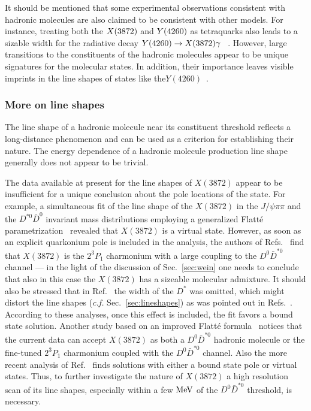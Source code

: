 It should be mentioned that some experimental observations consistent with
hadronic molecules are also claimed to be consistent with other models. For
instance, treating both the $X(3872)$ and $Y(4260)$ as tetraquarks also leads to a sizable
width for the radiative decay $Y(4260)\to X(3872)\gamma$ ~\cite{Chen:2015dig}.
However, large transitions to the constituents of the hadronic molecules appear
to be unique signatures for the molecular states.
In addition, their importance leaves visible imprints in the line shapes of
states like  the$Y(4260)$~\cite{Cleven:2013mka,Qin:2016spb}.
 	



\subsubsection{More on line shapes}
\label{sec:morelineshapes}

The line shape of a hadronic molecule near its constituent threshold
reflects a long-distance phenomenon and can be used as a criterion for
establishing their nature.
The energy dependence of a hadronic molecule production line shape
generally does not appear to be trivial.

The data available at present for the line shapes of $X(3872)$ appear to be
insufficient for a unique conclusion about the pole locations of the state.
For example, a simultaneous fit of the line shape of the $X(3872)$ in the
$J/\psi\pi\pi$ and the $D^{*0}\bar{D}^0$ invariant mass distributions employing
a generalized  Flatt\'e parametrization~\cite{Hanhart:2007yq} revealed that
$X(3872)$ is a virtual state.
However, as soon as an explicit quarkonium pole is included in the analysis, the
authors of Refs.~\cite{Zhang:2009bv,Kalashnikova:2009gt,Meng:2014ota} find that
$X(3872)$ is the $2^3P_1$ charmonium with a large coupling to the
$D^0\bar{D}^{*0}$ channel --- in the light of the discussion of
Sec.~\ref{sec:wein} one needs to conclude that also in this case the $X(3872)$
has a sizeable molecular admixture. It should also be stressed that in
Ref.~\cite{Hanhart:2007yq} the width of the $D^*$ was omitted, which might
distort the line shapes ({\sl c.f.} Sec.~\ref{sec:lineshapes}) as was pointed
out in Refs.~\cite{Stapleton:2009ey,Braaten:2007dw}. According to these
analyses, once this effect is included, the fit favors a bound state solution.
Another study based on an improved Flatt\'e formula~\cite{Artoisenet:2010va}
notices that the current data can accept $X(3872)$ as both a  $D^0\bar{D}^{*0}$
hadronic molecule or the fine-tuned $2^3P_1$ charmonium coupled with  the
$D^0\bar{D}^{*0}$ channel. Also the more recent analysis of
Ref.~\cite{Kang:2016jxw} finds solutions with either a bound state pole or
virtual states.
Thus, to further investigate the nature of $X(3872)$ a high resolution scan of
its line shapes, especially within a few $\mathrm{MeV}$ of the $D^0\bar{D}^{*0}$
threshold, is necessary.

